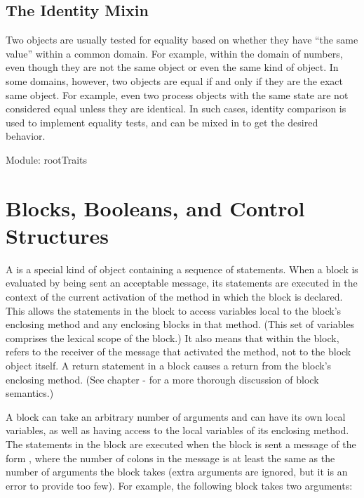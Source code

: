 \documentclass[letterpaper,10pt,english]{sphinxmanual}
\begin{document}
\subsection{The Identity Mixin}
\label{\detokenize{roots:the-identity-mixin}}
Two objects are usually tested for equality based on whether they have “the same value” within a
common domain. For example,  within the domain of numbers, even though they are not
the same object or even the same kind of object. In some domains, however, two objects are equal
if and only if they are the exact same object. For example, even two process objects with the same
state are not considered equal unless they are identical. In such cases, identity comparison is used
to implement equality tests, and  can be mixed in to get the desired behavior.

Module: rootTraits


\section{Blocks, Booleans, and Control Structures}
\label{\detokenize{blocks:blocks-booleans-and-control-structures}}\label{\detokenize{blocks::doc}}
A  is a special kind of object containing a sequence of statements. When a block is evaluated
by being sent an acceptable  message, its statements are executed in the context of the current
activation of the method in which the block is declared. This allows the statements in the block
to access variables local to the block’s enclosing method and any enclosing blocks in that method.
(This set of variables comprises the lexical scope of the block.) It also means that within the block,
 refers to the receiver of the message that activated the method, not to the block object itself.
A return statement in a block causes a return from the block’s enclosing method. (See chapter 
- {\hyperref[\detokenize{langref::doc}]{}} for a more thorough discussion of block semantics.)

A block can take an arbitrary number of arguments and can have its own local variables, as well as
having access to the local variables of its enclosing method. The statements in the block are executed
when the block is sent a message of the form , where the number of colons
in the message is at least the same as the number of arguments the block takes (extra
arguments are ignored, but it is an error to provide too few). For example, the following block takes
two arguments:
\end{document}
